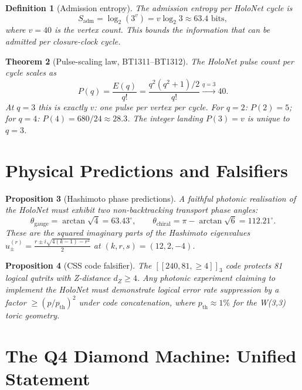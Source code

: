 \documentclass[12pt,a4paper]{article}
\newtheorem{theorem}{Theorem}[section]
\newtheorem{proposition}[theorem]{Proposition}
\newtheorem{definition}[theorem]{Definition}
\begin{document}
\begin{definition}[Admission entropy]
  The \emph{admission entropy} per HoloNet cycle is
  \[
    S_{\mathrm{adm}} = \log_2(3^v) = v\log_2 3 \approx 63.4\text{ bits},
  \]
  where $v=40$ is the vertex count. This bounds the information
  that can be admitted per closure-clock cycle.
\end{definition}

\begin{theorem}[Pulse-scaling law, BT1311--BT1312]
  The HoloNet pulse count per cycle scales as
  \[
    P(q) = \frac{E(q)}{q!} = \frac{q^2(q^2+1)/2}{q!} \xrightarrow{q=3} 40.
  \]
  At $q=3$ this is exactly $v$: one pulse per vertex per cycle.
  For $q=2$: $P(2)=5$; for $q=4$: $P(4)=680/24\approx 28.3$.
  The integer landing $P(3)=v$ is unique to $q=3$.
\end{theorem}

\section{Physical Predictions and Falsifiers}

\begin{proposition}[Hashimoto phase predictions]
  A faithful photonic realisation of the HoloNet must exhibit two
  non-backtracking transport phase angles:
  \[
    \theta_{\mathrm{gauge}} = \arctan\!\sqrt{4} = 63.43^\circ,
    \qquad
    \theta_{\mathrm{chiral}} = \pi - \arctan\!\sqrt{6} = 112.21^\circ.
  \]
  These are the squared imaginary parts of the Hashimoto eigenvalues
  $u_{\pm}^{(r)} = \tfrac{r\pm i\sqrt{4(k-1)-r^2}}{2}$ at $(k,r,s)=(12,2,-4)$.
\end{proposition}

\begin{proposition}[CSS code falsifier]
  The $[[240,81,\ge 4]]_3$ code protects 81 logical qutrits with
  Z-distance $d_Z\ge 4$. Any photonic experiment claiming to implement
  the HoloNet must demonstrate logical error rate suppression by a factor
  $\ge (p/p_{\mathrm{th}})^2$ under code concatenation, where
  $p_{\mathrm{th}}\approx 1\%$ for the W(3,3) toric geometry.
\end{proposition}

\section{The Q4 Diamond Machine: Unified Statement}
\end{document}
